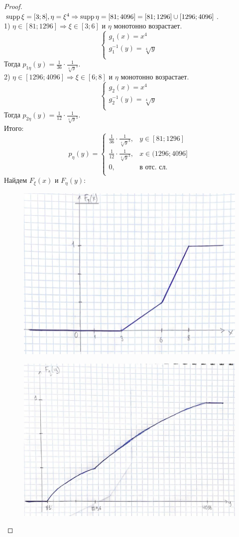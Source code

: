 \begin{proof}
\[\]
$\operatorname{\mathop{supp}}\xi = [3;8], \eta = \xi^4 \Rightarrow \operatorname{\mathop{supp}}\eta = [81;4096] = [81;1296]\cup[1296;4096]$.\\
1) $\eta\in [81;1296]\Rightarrow\xi\in [3;6]$ и $\eta$ монотонно возрастает.\\
\[
\begin{cases}
    g_1(x) = x^4\\
    g_1^{-1}(y) = \sqrt[4]y\\
\end{cases}
\]
Тогда $p_{1\eta}(y) = \frac{1}{36}\cdot\frac{1}{\sqrt[4]y^3}$.\\
2) $\eta\in [1296; 4096]\Rightarrow\xi\in [6;8]$ и $\eta$ монотонно возрастает.\\
\[
\begin{cases}
    g_2(x) = x^4\\
    g_2^{-1}(y) = \sqrt[4]y\\
\end{cases}
\]
Тогда $p_{2\eta}(y) = \frac{1}{12}\cdot\frac{1}{\sqrt[4]y^3}$.\\
Итого:
\[ 
p_{\eta}(y) = \begin{cases} 
          \frac{1}{36}\cdot\frac{1}{\sqrt[4]y^3}, & y\in [81; 1296] \\
          \frac{1}{12}\cdot\frac{1}{\sqrt[4]y^3}, & x\in (1296; 4096] \\
          0, & \text{в отс. сл.} \\
       \end{cases}
\]
Найдем $ F_{\xi}(x)$ и $ F_{\eta}(y)$:
\begin{figure}[h!]
    \centering
    \includegraphics[width=0.5\linewidth]{3.jpg}
    \caption{}
    \label{fig:enter-label}
\end{figure}
\begin{figure}[h!]
    \centering
    \includegraphics[width=0.5\linewidth]{4.jpg}

\end{figure}
\end{proof}
